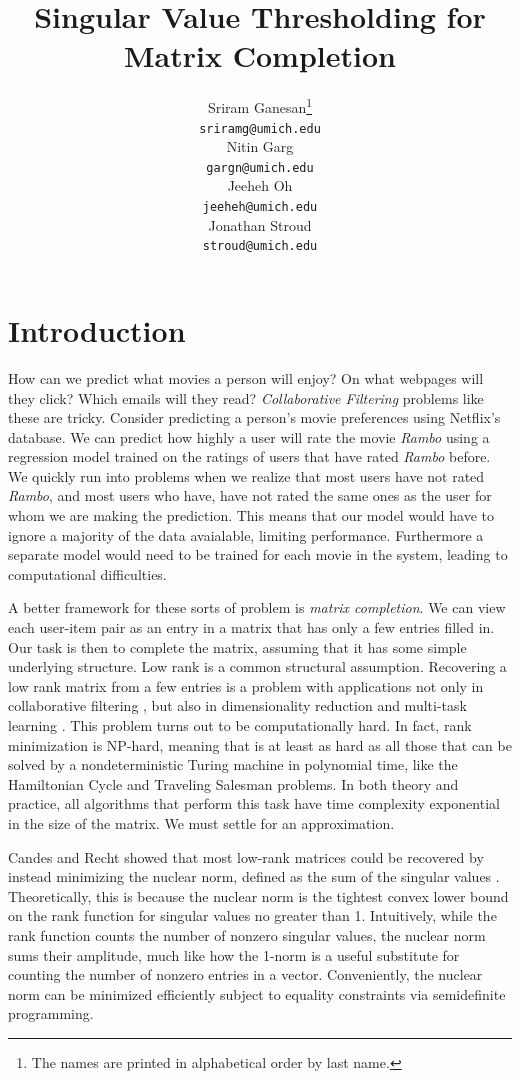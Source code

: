 \documentclass{article} %
\title{Singular Value Thresholding for Matrix Completion}
\author{
Sriram Ganesan\thanks{ The names are printed in alphabetical order by last name.} \\
\texttt{sriramg@umich.edu} \\
\And
Nitin Garg \\
\texttt{gargn@umich.edu} \\
\AND
Jeeheh Oh \\
\texttt{jeeheh@umich.edu} \\
\And
Jonathan Stroud \\
\texttt{stroud@umich.edu} \\
}
\begin{document}
\maketitle

\begin{abstract}

\end{abstract}

\section{Introduction}

How can we predict what movies a person will enjoy? On what webpages
will they click? Which emails will they read? \emph{Collaborative
  Filtering} problems like these are tricky. Consider predicting a
person's movie preferences using Netflix's database. We can predict
how highly a user will rate the movie \textit{Rambo} using a
regression model trained on the ratings of users that have rated
\textit{Rambo} before. We quickly run into problems when we realize
that most users have not rated \textit{Rambo}, and most users who
have, have not rated the same ones as the user for whom we are making
the prediction. This means that our model would have to ignore a
majority of the data avaialable, limiting performance. Furthermore a
separate model would need to be trained for each movie in the system,
leading to computational difficulties.

A better framework for these sorts of problem is \emph{matrix
  completion}. We can view each user-item pair as an entry in a matrix
that has only a few entries filled in. Our task is then to complete
the matrix, assuming that it has some simple underlying structure. Low
rank is a common structural assumption. Recovering a low rank matrix
from a few entries is a problem with applications not only in
collaborative filtering \cite{r25}, but also in dimensionality
reduction \cite{r20, r28} and multi-task learning \cite{r2, r22}. This
problem turns out to be computationally hard. In fact, rank
minimization is NP-hard, meaning that is at least as hard as all those
that can be solved by a nondeterministic Turing machine in polynomial
time, like the Hamiltonian Cycle and Traveling Salesman problems. In
both theory and practice, all algorithms that perform this task have
time complexity exponential in the size of the matrix. We must settle
for an approximation.

Candes and Recht showed that most low-rank matrices could be recovered
by instead minimizing the nuclear norm, defined as the sum of the
singular values \cite{r4}. Theoretically, this is because the nuclear
norm is the tightest convex lower bound on the rank function for
singular values no greater than 1. Intuitively, while the rank
function counts the number of nonzero singular values, the nuclear
norm sums their amplitude, much like how the 1-norm is a useful
substitute for counting the number of nonzero entries in a vector.
Conveniently, the nuclear norm can be minimized efficiently subject to
equality constraints via semidefinite programming.
\end{document}
